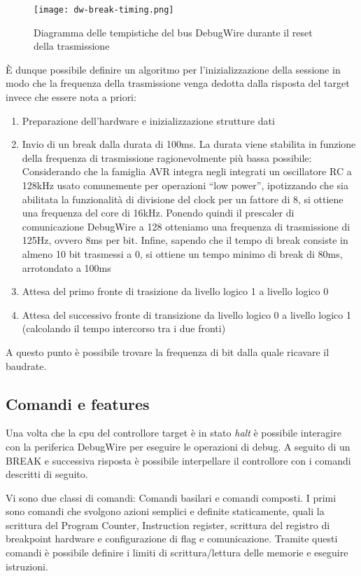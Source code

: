 \begin{figure}[h]
    \centering
    \texttt{[image: dw-break-timing.png]}
    \caption[]{Diagramma delle tempistiche del bus DebugWire durante il reset della trasmissione}\label{fig:dw-timings}
\end{figure}

È dunque possibile definire un algoritmo per l'inizializzazione della sessione in modo che la frequenza della trasmissione venga dedotta dalla risposta del target invece che essere nota a priori:
\begin{enumerate}
    \item Preparazione dell'hardware e inizializzazione strutture dati
    \item Invio di un break dalla durata di 100ms. La durata viene stabilita in funzione della frequenza di trasmissione ragionevolmente più bassa possibile: Considerando che la famiglia AVR integra negli integrati un oscillatore RC a 128kHz usato comunemente per operazioni ``low power'', ipotizzando che sia abilitata la funzionalità di divisione del clock per un fattore di 8\cite{avr:m328p}, si ottiene una frequenza del core di 16kHz. Ponendo quindi il prescaler di comunicazione DebugWire a 128 otteniamo una frequenza di trasmissione di 125Hz, ovvero 8ms per bit. Infine, sapendo che il tempo di break consiste in almeno 10 bit trasmessi a 0, si ottiene un tempo minimo di break di 80ms, arrotondato a 100ms
    \item Attesa del primo fronte di trasizione da livello logico 1 a livello logico 0
    \item Attesa del successivo fronte di transizione da livello logico 0 a livello logico 1 (calcolando il tempo intercorso tra i due fronti)
\end{enumerate}

A questo punto è possibile trovare la frequenza di bit dalla quale ricavare il baudrate.

\subsection{Comandi e features}

Una volta che la cpu del controllore target è in stato \textit{halt} è possibile interagire con la periferica DebugWire per eseguire le operazioni di debug. A seguito di un BREAK e successiva risposta è possibile interpellare il controllore con i comandi descritti di seguito.

Vi sono due classi di comandi: Comandi basilari e comandi composti.
I primi sono comandi che svolgono azioni semplici e definite staticamente, quali la scrittura del Program Counter, Instruction register, scrittura del registro di breakpoint hardware e configurazione di flag e comunicazione. Tramite questi comandi è possibile definire i limiti di scrittura/lettura delle memorie e eseguire istruzioni.

